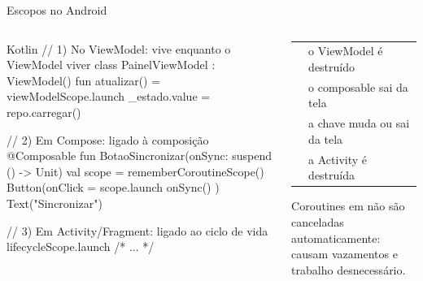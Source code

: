 \documentclass[aspectratio=169,10pt]{beamer}
\begin{document}
\begin{frame}[fragile]{Escopos no Android}
  \begin{columns}[T]
    \begin{column}{0.52\textwidth}
\begin{codigo}[title=Os três escopos do dia a dia]{Kotlin}
// 1) No ViewModel: vive enquanto o ViewModel viver
class PainelViewModel : ViewModel() {
  fun atualizar() = viewModelScope.launch {
    _estado.value = repo.carregar()
  }
}

// 2) Em Compose: ligado à composição
@Composable
fun BotaoSincronizar(onSync: suspend () -> Unit) {
  val scope = rememberCoroutineScope()
  Button(onClick = { scope.launch { onSync() } }) {
    Text("Sincronizar")
  }
}

// 3) Em Activity/Fragment: ligado ao ciclo de vida
lifecycleScope.launch { /* ... */ }
\end{codigo}
    \end{column}
    \begin{column}{0.46\textwidth}
      \footnotesize
      \begin{tabularx}{\linewidth}{@{}l L@{}}
        \toprule
         &  \\
        \midrule
         & o ViewModel é destruído \\
         & o composable sai da tela \\
         & a chave muda ou sai da tela \\
         & a Activity é destruída \\
        \bottomrule
      \end{tabularx}
      \begin{erro}
        Coroutines em  não são canceladas automaticamente: causam vazamentos e trabalho desnecessário.
      \end{erro}
    \end{column}
  \end{columns}
\end{frame}
\end{document}
